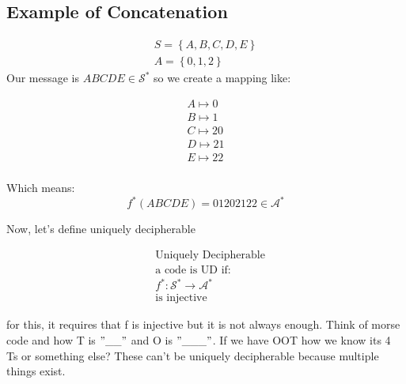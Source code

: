 \documentclass[12pt]{article}
\begin{document}
\subsection*{Example of Concatenation}
\begin{align*}
    S = \left\{A,B,C,D,E\right\}\\
    A = \left\{0,1,2\right\}
\end{align*}
Our message is $ABCDE \in \mathcal{S}^*$
so we create a mapping like:

\begin{align*}
    A \mapsto 0\\
    B \mapsto 1\\
    C \mapsto 20\\
    D \mapsto 21\\
    E \mapsto 22\\
\end{align*}

Which means:
\[f^*(ABCDE) = 01202122 \in \mathcal{A}^*\]

Now, let's define uniquely decipherable

\begin{align*}
    &\text{Uniquely Decipherable}\\
    &\text{a code is UD if:}\\
    &f^*:\mathcal{S}^* \rightarrow \mathcal{A}^*\\
    &\text{is injective}
\end{align*}

 for this, it requires that f is injective but it is not always enough. Think of morse code and how T is $"\_ \_"$ and O is $"\_ \_ \_"$. If we have OOT how we know its 4 Ts or something else? These can't be uniquely decipherable because multiple things exist.
\end{document}
